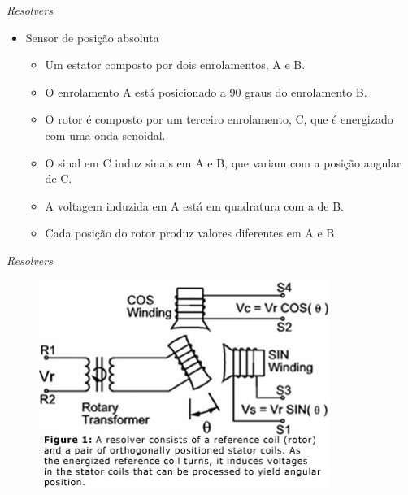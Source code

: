 \documentclass[aspectratio=169,
				xcolor=table]{beamer}
\begin{document}
		\begin{frame}{\textit{Resolvers}}
			\begin{itemize}
				\item Sensor de posição absoluta
				\begin{itemize}
					\item Um estator composto por dois enrolamentos, A e B.
					\item O enrolamento A está posicionado a 90 graus do enrolamento B.
					\item O rotor é composto por um terceiro enrolamento, C, que é energizado com uma onda senoidal.
					\item O sinal em C induz sinais em A e B, que variam com a posição angular de C.
					\item A voltagem induzida em A está em quadratura com a de B.
					\item Cada posição do rotor produz valores diferentes em A e B.
				\end{itemize}
			\end{itemize}
		\end{frame}
	
		\begin{frame}{\textit{Resolvers}}
			\begin{figure}
				\centering
				\includegraphics[scale=.35]{../figs/cap03/Imagem41.jpg}			
			\end{figure}			
		\end{frame}
		
\end{document}
